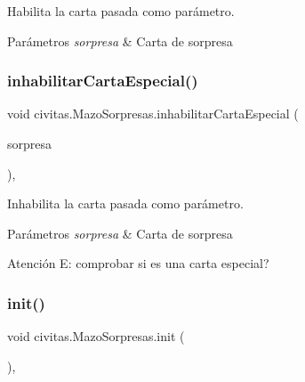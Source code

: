 Habilita la carta pasada como parámetro. 


\begin{DoxyParams}{Parámetros}
{\em sorpresa} & Carta de sorpresa \\
\hline
\end{DoxyParams}
\mbox{\label{classcivitas_1_1MazoSorpresas_a2f19b2fb1d7697611f22fd44dc81eed3}} 
\subsubsection{\texorpdfstring{inhabilitar\+Carta\+Especial()}{inhabilitarCartaEspecial()}}
{\footnotesize\ttfamily void civitas.\+Mazo\+Sorpresas.\+inhabilitar\+Carta\+Especial (\begin{DoxyParamCaption}\item[{\hyperlink{classcivitas_1_1Sorpresa}{Sorpresa}}]{sorpresa }\end{DoxyParamCaption})\hspace{0.3cm}{\ttfamily [inline]}, {\ttfamily [package]}}



Inhabilita la carta pasada como parámetro. 


\begin{DoxyParams}{Parámetros}
{\em sorpresa} & Carta de sorpresa \\
\hline
\end{DoxyParams}
\begin{DoxyWarning}{Atención}
E\+: comprobar si es una carta especial? 
\end{DoxyWarning}
\mbox{\label{classcivitas_1_1MazoSorpresas_a8a5c58c8a162c9da0088678f3803c7dd}} 
\subsubsection{\texorpdfstring{init()}{init()}}
{\footnotesize\ttfamily void civitas.\+Mazo\+Sorpresas.\+init (\begin{DoxyParamCaption}{ }\end{DoxyParamCaption})\hspace{0.3cm}{\ttfamily [inline]}, {\ttfamily [private]}}



